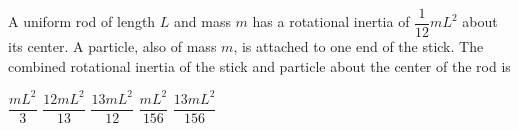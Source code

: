 \documentclass{../../oss-classkick-exam}
\begin{document}
\begin{multicols*}{2}
\begin{questions}
    
    \question A uniform rod of length $L$ and mass $m$ has a rotational inertia
    of $\dfrac1{12}mL^2$ about its center. A particle, also of mass $m$, is
    attached to one end of the stick. The combined rotational inertia of the
    stick and particle about the center of the rod is
    \begin{center}
    \end{center}
    \begin{choices}
      \choice$\dfrac{mL^2}3$
      \choice$\dfrac{12mL^2}{13}$
      \choice$\dfrac{13mL^2}{12}$
      \choice$\dfrac{mL^2}{156}$
      \choice$\dfrac{13mL^2}{156}$
    \end{choices}


\end{questions}
\end{multicols*}
\end{document}
